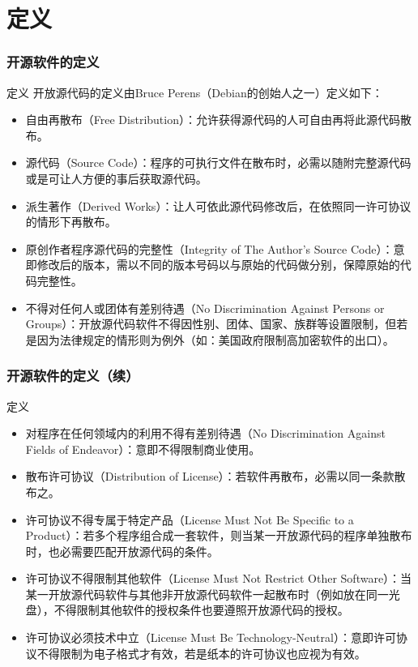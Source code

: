 \documentclass{beamer}
\begin{document}
\section{定义}
\begin{frame}
  \frametitle{开源软件的定义}
	\begin{block}{定义}
		开放源代码的定义由Bruce Perens（Debian的创始人之一）定义如下：
		\scriptsize
		\begin{itemize}
			\item 自由再散布（Free Distribution）：允许获得源代码的人可自由再将此源代码散布。
			\item 源代码（Source Code）：程序的可执行文件在散布时，必需以随附完整源代码或是可让人方便的事后获取源代码。
			\item 派生著作（Derived Works）：让人可依此源代码修改后，在依照同一许可协议的情形下再散布。
			\item 原创作者程序源代码的完整性（Integrity of The Author's Source Code）：意即修改后的版本，需以不同的版本号码以与原始的代码做分别，保障原始的代码完整性。
			\item 不得对任何人或团体有差别待遇（No Discrimination Against Persons or Groups）：开放源代码软件不得因性别、团体、国家、族群等设置限制，但若是因为法律规定的情形则为例外（如：美国政府限制高加密软件的出口）。
		\end{itemize}
	\end{block}
\end{frame}
\begin{frame}
  \frametitle{开源软件的定义（续）}
	\begin{block}{定义}
		\scriptsize
		\begin{itemize}
			\item 对程序在任何领域内的利用不得有差别待遇（No Discrimination Against Fields of Endeavor）：意即不得限制商业使用。
			\item 散布许可协议（Distribution of License）：若软件再散布，必需以同一条款散布之。
			\item 许可协议不得专属于特定产品（License Must Not Be Specific to a Product）：若多个程序组合成一套软件，则当某一开放源代码的程序单独散布时，也必需要匹配开放源代码的条件。
			\item 许可协议不得限制其他软件（License Must Not Restrict Other Software）：当某一开放源代码软件与其他非开放源代码软件一起散布时（例如放在同一光盘），不得限制其他软件的授权条件也要遵照开放源代码的授权。
			\item 许可协议必须技术中立（License Must Be Technology-Neutral）：意即许可协议不得限制为电子格式才有效，若是纸本的许可协议也应视为有效。
		\end{itemize}
	\end{block}
\end{frame}
\end{document}
